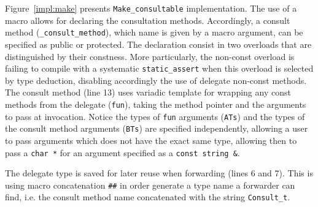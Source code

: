 \documentclass{article}
\begin{document}
Figure~\ref{impl:make} presents \verb+Make_consultable+ implementation. The use of a macro allows for declaring the consultation methods. Accordingly, a consult method (\verb+_consult_method+), which name is given by a macro argument, can be specified as public or protected. The declaration consist in two overloads that are distinguished by their constness. More particularly, the non-const overload is failing to compile with a systematic \verb+static_assert+ when this overload is selected by type deduction, disabling accordingly the use of delegate non-const methods. The consult method (line 13) uses variadic template for wrapping any const methods from the delegate (\verb+fun+), taking the method pointer and the arguments to pass at invocation. Notice the types of \verb+fun+ arguments (\verb+ATs+) and the types of the consult method arguments (\verb+BTs+) are specified independently, allowing a user to pass arguments which does not have the exact same type, allowing then to pass a \verb+char *+ for an argument specified as a \verb+const string &+.      
 
The delegate type is saved for later reuse when forwarding (lines 6 and 7). This is using macro concatenation \verb+##+ in order generate a type name a forwarder can find, i.e. the consult method name concatenated with the string \verb+Consult_t+. 
\end{document}
